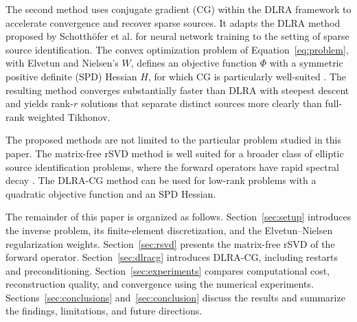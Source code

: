 The second method uses conjugate gradient (CG) within the DLRA framework to accelerate convergence and recover sparse sources. It adapts the DLRA method proposed by Schotthöfer et al. for neural network training \cite{schotthoferLowrankLotteryTickets2022} to the setting of sparse source identification. The convex optimization problem of Equation~\eqref{eq:problem}, with Elvetun and Nielsen's $W$, defines an objective function $\Phi$ with a symmetric positive definite (SPD) Hessian $H$, for which CG is particularly well-suited \cite{hestenesMethodsConjugateGradients1952,fletcherFunctionMinimizationConjugate1964}. The resulting method converges substantially faster than DLRA with steepest descent and yields rank-$r$ solutions that separate distinct sources more clearly than full-rank weighted Tikhonov.

The proposed methods are not limited to the particular problem studied in this paper. The matrix-free rSVD method is well suited for a broader class of elliptic source identification problems, where the forward operators have rapid spectral decay \cite{evansPartialDifferentialEquations2010,engl1996regularization}. The DLRA-CG method can be used for low-rank problems with a quadratic objective function and an SPD Hessian.

The remainder of this paper is organized as follows. Section~\ref{sec:setup} introduces the inverse problem, its finite-element discretization, and the Elvetun--Nielsen regularization weights. Section~\ref{sec:rsvd} presents the matrix-free rSVD of the forward operator. Section~\ref{sec:dlracg} introduces DLRA-CG, including restarts and preconditioning. Section~\ref{sec:experiments} compares computational cost, reconstruction quality, and convergence using the numerical experiments. Sections~\ref{sec:conclusions} and~\ref{sec:conclusion} discuss the results and summarize the findings, limitations, and future directions.
